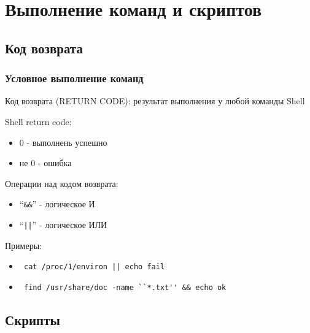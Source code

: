 \section{Выполнение команд и скриптов}

\subsection{Код возврата}

\begin{frame}[fragile]
  \frametitle{Условное выполнение команд}

  \Large{\alert{Код возврата (RETURN CODE)}}: \newline 
  \normalsize{результат выполнения у любой команды Shell}
  \newline

  Shell return code:
  \begin{itemize}
    \item 0 - выполнень успешно
    \item не 0 - ошибка
  \end{itemize}
  \pause

  Операции над кодом возврата:
  \begin{itemize}
    \item ``\verb+&&+'' - логическое И
    \item ``\verb+||+'' - логическое ИЛИ
  \end{itemize}
  \pause

  Примеры:
  \begin{itemize}
    \item \verb+ cat /proc/1/environ || echo fail +
    \item \verb+ find /usr/share/doc -name ``*.txt'' && echo ok+
  \end{itemize}

\end{frame}

\subsection{Скрипты}

